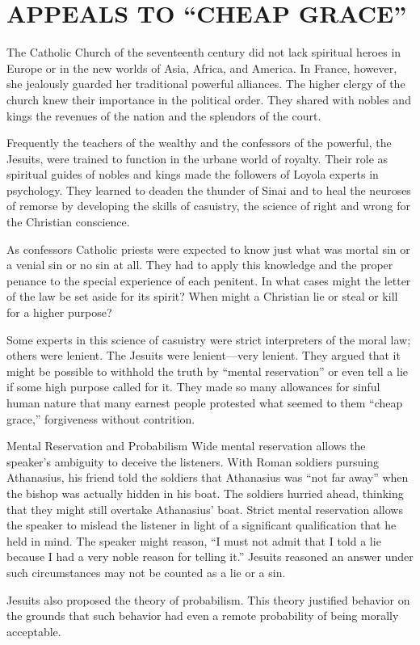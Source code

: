 \section{APPEALS TO “CHEAP GRACE”}

The Catholic Church of the seventeenth century did not lack spiritual heroes in Europe or in the new
worlds of Asia, Africa, and America. In France, however, she jealously guarded her traditional
powerful alliances. The higher clergy of the church knew their importance in the political order.
They shared with nobles and kings the revenues of the nation and the splendors of the court.

Frequently the teachers of the wealthy and the confessors of the powerful, the Jesuits, were trained
to function in the urbane world of royalty. Their role as spiritual guides of nobles and kings made
the followers of Loyola experts in psychology. They learned to deaden the thunder of Sinai and to
heal the neuroses of remorse by developing the skills of casuistry, the science of right and wrong
for the Christian conscience.

As confessors Catholic priests were expected to know just what was mortal sin or a venial sin or no
sin at all. They had to apply this knowledge and the proper penance to the special experience of
each penitent. In what cases might the letter of the law be set aside for its spirit? When might a
Christian lie or steal or kill for a higher purpose?

Some experts in this science of casuistry were strict interpreters of the moral law; others were
lenient. The Jesuits were lenient—very lenient. They argued that it might be possible to withhold
the truth by “mental reservation” or even tell a lie if some high purpose called for it. They made
so many allowances for sinful human nature that many earnest people protested what seemed to them
“cheap grace,” forgiveness without contrition.

\begin{sidebar}{Mental Reservation and Probabilism}
Wide mental reservation allows the speaker’s ambiguity to deceive the listeners. With Roman soldiers
pursuing Athanasius, his friend told the soldiers that Athanasius was “not far away” when the bishop
was actually hidden in his boat. The soldiers hurried ahead, thinking that they might still overtake
Athanasius’ boat. Strict mental reservation allows the speaker to mislead the listener in light of a
significant qualification that he held in mind. The speaker might reason, “I must not admit that I
told a lie because I had a very noble reason for telling it.” Jesuits reasoned an answer under such
circumstances may not be counted as a lie or a sin.

Jesuits also proposed the theory of probabilism. This theory justified behavior on the grounds that
such behavior had even a remote probability of being morally acceptable.
\end{sidebar}

